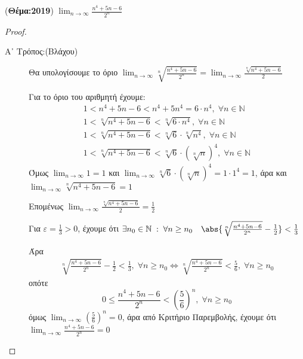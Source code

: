         \item ({\bfseries Θέμα:2019}) $ \lim_{n \to \infty} \frac{n^{4}+5n-6}{2^{n}} $ 
          \begin{proof}
          \item {}
            \begin{description}
              \item [Α᾽ Τρόπος:(Βλάχου)]
                Θα υπολογίσουμε το όριο $ \lim_{n \to \infty} 
                \sqrt[n]{\frac{n^{4}+5n-6}{2^{n}}} = \lim_{n \to \infty} 
                \frac{\sqrt[n]{n^{4}+5n-6}}{2}  $

                Για το όριο του αριθμητή έχουμε:
                \begin{gather*}
                  1<n^{4}+5n-6<n^{4}+5n^{4}=6\cdot n^{4}, \; 
                  \forall n \in \mathbb{N} \\
                  1 < \sqrt[n]{n^{4}+5n-6} < \sqrt[n]{6\cdot n^{4}}, \; 
                  \forall n \in \mathbb{N} \\
                  1 < \sqrt[n]{n^{4}+5n-6} < \sqrt[n]{6} \cdot \sqrt[n]{n^{4}}, 
                  \; \forall n \in \mathbb{N} \\
                  1 < \sqrt[n]{n^{4}+5n-6} < \sqrt[n]{6} \cdot (\sqrt[n]{n})^{4},
                  \; \forall n \in \mathbb{N}
                \end{gather*} 
                Όμως $ \lim_{n \to \infty} 1 = 1 $ και $ \lim_{n \to \infty} 
                \sqrt[n]{6} \cdot (\sqrt[n]{n} )^{4} = 1 \cdot 1^{4} =1 $, άρα 
                και $ \lim_{n \to \infty} \sqrt[n]{n^{4}+5n-6} = 1 $

                Επομένως $ \lim_{n \to \infty} \frac{\sqrt[n]{n^{4}+5n-6}}{2} = 
                \frac{1}{2} $

                Για $ \varepsilon = \frac{1}{3} >0 $, έχουμε ότι 
                $ \exists n_{0} \in \mathbb{N} \; : \; \forall n \geq n_{0} 
                \quad \abs{\sqrt[n]{\frac{n^{4}+5n-6}{2^{n}}} - \frac{1}{2}} < 
                \frac{1}{3} $

                Άρα 
                \begin{gather*}
                  \sqrt[n]{\frac{n^{4}+5n-6}{2^{n}}} - \frac{1}{2} < 
                  \frac{1}{3}, \; \forall n \geq n_{0} \Leftrightarrow  
                  \sqrt[n]{\frac{n^{4}+5n-6}{2^{n}}} < \frac{5}{6}, \;
                  \forall n \geq n_{0} 
                \end{gather*}
                οπότε 
                \[
                  0 \leq \frac{n^{4}+5n-6}{2^{n}} < 
                  \left(\frac{5}{6} \right)^{n}, \; \forall n \geq n_{0} 
                \] 
                όμως $ \lim_{n \to \infty} \left(\frac{5}{6} \right)^{n} = 0 $,
                άρα από Κριτήριο Παρεμβολής, έχουμε ότι 
                $ \lim_{n \to \infty} \frac{n^{4}+5n-6}{2^{n}} = 0 $


\end{description}
\end{proof}
